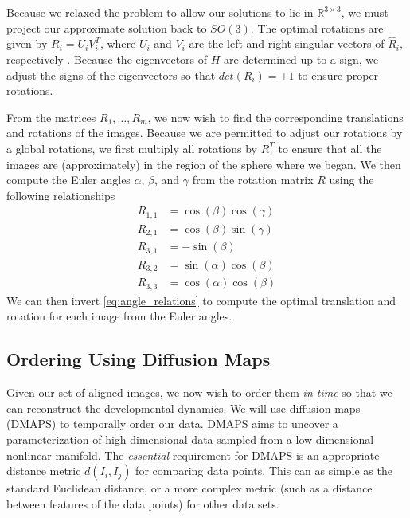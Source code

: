 \documentclass[11pt]{article}
\begin{document}
Because we relaxed the problem to allow our solutions to lie in $\mathbb{R}^{3 \times 3}$, we must project our approximate solution back to $SO(3)$.
%
The optimal rotations are given by $R_i = U_i V_i^T$, where $U_i$ and $V_i$ are the left and right singular vectors of $\hat{R}_i$, respectively \cite{...}. 
%
Because the eigenvectors of $H$ are determined up to a sign, we adjust the signs of the eigenvectors so that $det(R_i) = +1$ to ensure proper rotations.
%

From the matrices $R_1, \dots, R_m$, we now wish to find the corresponding translations and rotations of the images.
%
Because we are permitted to adjust our rotations by a global rotations, we first multiply all rotations by $R_1^T$ to ensure that all the images are (approximately) in the region of the sphere where we began.
%
We then compute the Euler angles $\alpha$, $\beta$, and $\gamma$ from the rotation matrix $R$ using the following relationships
\begin{equation}
\begin{aligned}
R_{1,1} & = \cos(\beta)\cos(\gamma) \\
R_{2,1} & = \cos(\beta)\sin(\gamma) \\
R_{3,1} & = -\sin(\beta) \\
R_{3,2} & = \sin(\alpha)\cos(\beta) \\
R_{3,3} & = \cos(\alpha)\cos(\beta) 
\end{aligned}
\end{equation}
%
We can then invert \eqref{eq:angle_relations} to compute the optimal translation and rotation for each image from the Euler angles.

\subsection{Ordering Using Diffusion Maps}

Given our set of aligned images, we now wish to order them {\em in time} so that we can reconstruct the developmental dynamics.
%
We will use diffusion maps (DMAPS) \cite{coifman2005geometric} to temporally order our data.
%
DMAPS aims to uncover a parameterization of high-dimensional data sampled from a low-dimensional nonlinear manifold.
%
The {\em essential} requirement for DMAPS is an appropriate distance metric $d(I_i, I_j)$ for comparing data points. 
%
This can as simple as the standard Euclidean distance, or a more complex metric (such as a distance between features of the data points) for other data sets.
\end{document}
